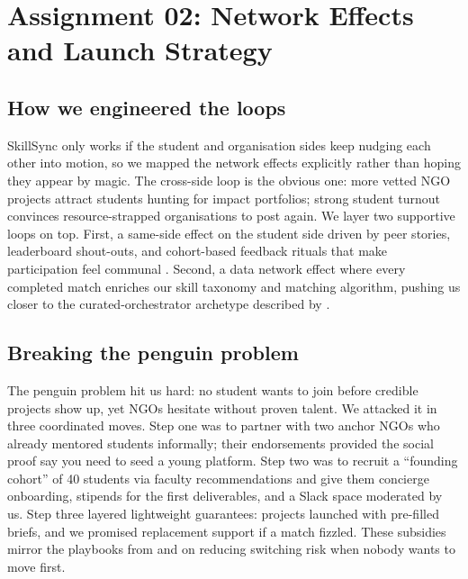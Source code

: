 \section*{Assignment 02: Network Effects and Launch Strategy}

\subsection*{How we engineered the loops}
SkillSync only works if the student and organisation sides keep nudging each other into motion, so we mapped the network effects explicitly rather than hoping they appear by magic. The cross-side loop is the obvious one: more vetted NGO projects attract students hunting for impact portfolios; strong student turnout convinces resource-strapped organisations to post again. We layer two supportive loops on top. First, a same-side effect on the student side driven by peer stories, leaderboard shout-outs, and cohort-based feedback rituals that make participation feel communal \citep{Choudary2016}. Second, a data network effect where every completed match enriches our skill taxonomy and matching algorithm, pushing us closer to the curated-orchestrator archetype described by \citet{Reillier2017}.

\subsection*{Breaking the penguin problem}
The penguin problem hit us hard: no student wants to join before credible projects show up, yet NGOs hesitate without proven talent. We attacked it in three coordinated moves. Step one was to partner with two anchor NGOs who already mentored students informally; their endorsements provided the social proof \citet{HagiuWright2013} say you need to seed a young platform. Step two was to recruit a ``founding cohort'' of 40 students via faculty recommendations and give them concierge onboarding, stipends for the first deliverables, and a Slack space moderated by us. Step three layered lightweight guarantees: projects launched with pre-filled briefs, and we promised replacement support if a match fizzled. These subsidies mirror the playbooks from \citet{Gunasilan2024} and \citet{FarrellSaloner1986} on reducing switching risk when nobody wants to move first.

